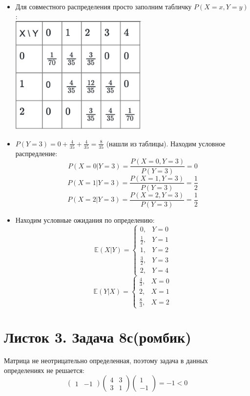 \begin{itemize}
\item Для совместного распределения просто заполним табличку $P\left(X = x, Y = y\right)$: \\
\includegraphics[width=193pt]{img1.png}
\item $P\left(Y = 3\right) = 0 + \frac{4}{35} + \frac{4}{35} = \frac{8}{35}$ (нашли из таблицы). Находим условное распредление:
\[
    P\left(X = 0 | Y = 3\right) = \frac{P\left(X = 0, Y = 3\right)}{P\left(Y = 3\right)} =0 
\]
\[
    P\left(X = 1 | Y = 3\right) = \frac{P\left(X = 1, Y = 3\right)}{P\left(Y = 3\right)} = \frac 1 2
\]
\[
    P\left(X = 2 | Y = 3\right) = \frac{P\left(X = 2, Y = 3\right)}{P\left(Y = 3\right)} = \frac 1 2
\]
\item Находим условные ожидания по определению:
\[
    \mathbb{E}\left(X | Y\right) = 
    \begin{cases}
    0, & Y = 0 \\
    \frac 1 2, & Y = 1 \\
    1, & Y = 2 \\
    \frac 3 2, & Y = 3 \\
    2, & Y = 4 
    \end{cases}
\]
\[
    \mathbb{E} \left(Y | X\right) = 
    \begin{cases}
    \frac 4 3, & X = 0 \\
    2 ,& X = 1\\
    \frac 8 3 ,& X = 2
    \end{cases}
\]
\end{itemize}

\section{Листок 3. Задача 8с(ромбик)}
Матрица не неотрицательно определенная, поэтому задача в данных определениях не решается:
\[
    \begin{pmatrix}
    1 & -1
    \end{pmatrix} 
    \begin{pmatrix}
    4 & 3 \\ 3 & 1
    \end{pmatrix} 
    \begin{pmatrix}
    1 \\ -1
    \end{pmatrix} = -1 < 0
\]

